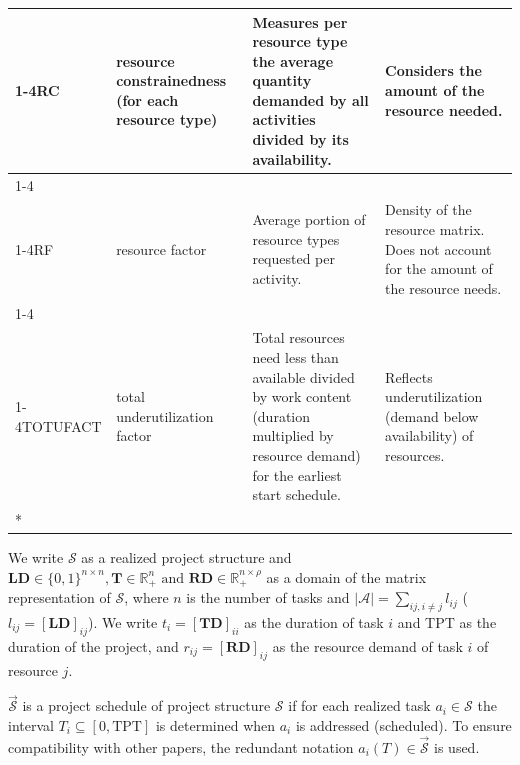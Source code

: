 \documentclass[preprint,
3p]{elsarticle} %
\begin{document}
\begin{appendices}
\begin{longtable}[t]{l>{\raggedright\arraybackslash}p{2.2cm}>{\raggedright\arraybackslash}p{4.1cm}>{\raggedright\arraybackslash}p{3.5cm}}
\cmidrule{1-4}\pagebreak[0]
RC & resource constrainedness (for each resource type) & Measures per resource type the average quantity demanded by all activities divided by its availability. & Considers the amount of the resource needed.\\
\cmidrule{1-4}\pagebreak[0]
\cellcolor{gray!10}{XCON} & \cellcolor{gray!10}{average resource constrainedness over time} & \cellcolor{gray!10}{Sum of renewable resource demands (divided by the number of non-zero demands) divided by the availability of the given resource type.} & \cellcolor{gray!10}{Reflects the "tightness" of certain resource types.}\\
\cmidrule{1-4}\pagebreak[0]
RF & resource factor & Average portion of resource types requested per activity. & Density of the resource matrix. Does not account for the amount of the resource needs.\\
\cmidrule{1-4}\pagebreak[0]
\cellcolor{gray!10}{TOTOFACT} & \cellcolor{gray!10}{total obstruction factor} & \cellcolor{gray!10}{Excess resource requirements divided by resource work content (duration multiplied by resource demand), measured for the earliest start schedule.} & \cellcolor{gray!10}{Excessive resource needs.}\\
\cmidrule{1-4}\pagebreak[0]
TOTUFACT & total underutilization factor & Total resources need less than available divided by work content (duration multiplied by resource demand) for the earliest start schedule. & Reflects underutilization (demand below availability) of resources.\\*
\end{longtable}
\endgroup{}

We write \(\mathcal{S}\) as a realized project structure and
\(\mathbf{LD} \in \{0,1\}^{n\times n}, \mathbf{T} \in \mathbb{R}_+^n \text{ and } \mathbf{RD} \in \mathbb{R}_+^{n \times \rho}\)
as a domain of the matrix representation of \(\mathcal{S}\), where \(n\)
is the number of tasks and \(|\mathcal{A}| =\sum_{ij, i\neq j} l_{ij}\)
(\(l_{ij}=[\mathbf{LD}]_{ij}\)). We write \(t_i = [\mathbf{TD}]_{ii}\)
as the duration of task \(i\) and TPT as the duration of the project,
and \(r_{ij}=[\mathbf{RD}]_{ij}\) as the resource demand of task \(i\)
of resource \(j\).

\(\overrightarrow{\mathcal{S}}\) is a project schedule of project
structure \(\mathcal{S}\) if for each realized task
\(a_i\in \mathcal{S}\) the interval \(T_i \subseteq [0,\text{TPT}]\) is
determined when \(a_i\) is addressed (scheduled). To ensure
compatibility with other papers, the redundant notation
\(a_i(T)\in \overrightarrow{\mathcal{S}}\) is used.


\end{appendices}
\end{document}
